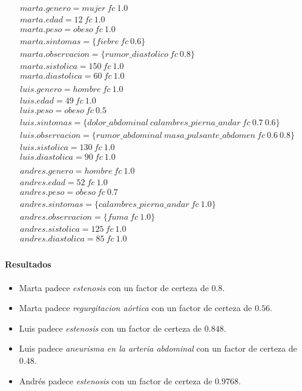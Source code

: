 \documentclass[10pt, a4paper,spanish]{article}
\begin{document}
			\begin{equation*}
				\begin{split}
					marta.genero=mujer \ fc \  1.0 \\
					marta.edad=12 \ fc \  1.0 \\
					marta.peso=obeso \ fc \  1.0 \\
					marta.sintomas=\{fiebre \ fc \  0.6\} \\
					marta.observacion=\{rumor\_diastolico \ fc \  0.8\} \\
					marta.sistolica=150 \ fc \  1.0 \\
					marta.diastolica=60 \ fc \  1.0\\
					\\
					luis.genero=hombre  \ fc \  1.0 \\
					luis.edad=49  \ fc \   1.0 \\
					luis.peso=obeso \ fc \  0.5 \\
					luis.sintomas=\{dolor\_abdominal \ calambres\_pierna\_andar \ fc \  0.7 \ 0.6\} \\
					luis.observacion=\{rumor\_abdominal \ masa\_pulsante\_abdomen \ fc \  0.6 \ 0.8\} \\
					luis.sistolica=130 \ fc \  1.0 \\
					luis.diastolica=90 \ fc \  1.0 \\
					\\
					andres.genero=hombre \ fc \  1.0 \\
					andres.edad=52 \ fc \  1.0 \\
					andres.peso=obeso \ fc \  0.7 \\
					andres.sintomas=\{calambres\_pierna\_andar \ fc \  1.0 \} \\
					andres.observacion=\{fuma \ fc \  1.0\} \\
					andres.sistolica=125 \ fc \  1.0 \\
					andres.diastolica=85 \ fc \  1.0 \\
				\end{split}
			\end{equation*}

			\paragraph{Resultados}
			\begin{itemize}

				\item Marta padece \emph{estenosis} con un factor de certeza de $0.8$.

				\item Marta padece \emph{regurgitacion aórtica} con un factor de certeza de $0.56$.

				\item	Luis padece \emph{estenosis} con un factor de certeza de $0.848$.

				\item	Luis padece \emph{aneurisma en la arteria abdominal} con un factor de certeza de $0.48$.

				\item Andrés padece \emph{estenosis} con un factor de certeza de $0.9768$.

			\end{itemize}
\end{document}
